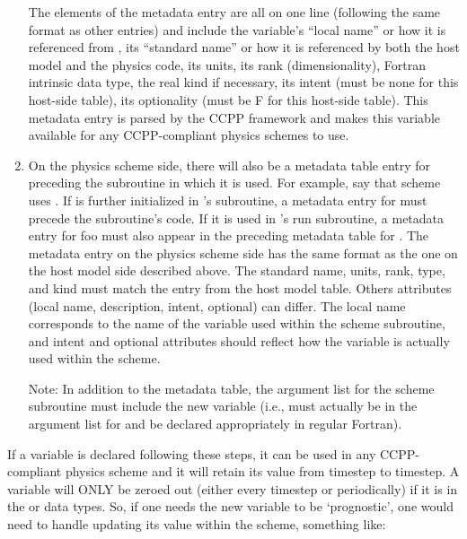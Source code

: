 \begin{enumerate}
The elements of the metadata entry are all on one line (following the same format as other entries) and include the variable's ``local name'' or how it is referenced from , its ``standard name'' or how it is referenced by both the host model and the physics code, its units, its rank (dimensionality), Fortran intrinsic data type, the real kind if necessary, its intent (must be none for this host-side table), its optionality (must be F for this host-side table). This metadata entry is parsed by the CCPP framework and makes this variable available for any CCPP-compliant physics schemes to use.

\item On the physics scheme side, there will also be a metadata table entry for  preceding the subroutine in which it is used. For example, say that scheme  uses . If  is further initialized in 's  subroutine, a metadata entry for  must precede the  subroutine's code. If it is used in 's run subroutine, a metadata entry for foo must also appear in the preceding metadata table for . The metadata entry on the physics scheme side has the same format as the one on the host model side described above. The standard name, units, rank, type, and kind must match the entry from the host model table. Others attributes (local name, description, intent, optional) can differ. The local name corresponds to the name of the variable used within the scheme subroutine, and intent and optional attributes should reflect how the variable is actually used within the scheme.

Note: In addition to the metadata table, the argument list for the scheme subroutine must include the new variable (i.e.,  must actually be in the argument list for  and be declared appropriately in regular Fortran).

\end{enumerate}

If a variable is declared following these steps, it can be used in any CCPP-compliant physics scheme and it will retain its value from timestep to timestep. A variable will ONLY be zeroed out (either every timestep or periodically) if it is in the  or  data types. So, if one needs the new variable to be `prognostic', one would need to handle updating its value within the scheme, something like:

